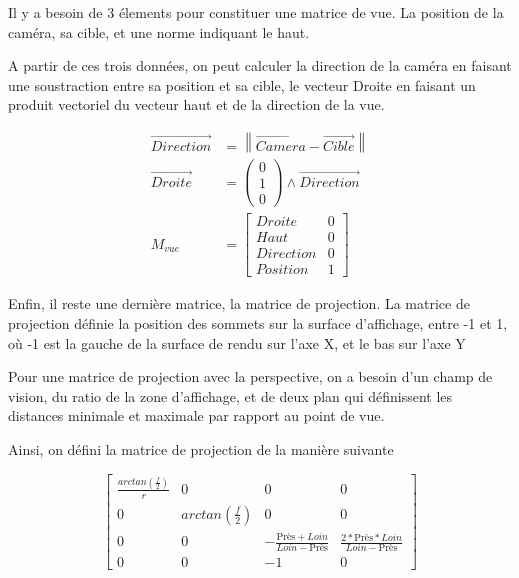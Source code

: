 \documentclass[pdftex, 11pt, a4paper, titlepage]{article}
\newcommand{\vect}[1]{\overrightarrow{#1}}
\begin{document}
Il y a besoin de 3 élements pour constituer une matrice de vue.  La
position de la caméra, sa cible, et une norme indiquant le haut.

A partir de ces trois données, on peut calculer la direction de la
caméra en faisant une soustraction entre sa position et sa cible, le
vecteur Droite en faisant un produit vectoriel du vecteur haut et de
la direction de la vue.

\begin{align*}
  \vect{Direction} &= \left\| \vect{Camera} - \vect{Cible} \right\|\\
  \vect{Droite} &=
  \begin{pmatrix}
    0 \\
    1 \\
    0
  \end{pmatrix}
  \wedge %
  \vect{Direction}\\
  M_{vue} &= 
  \begin{bmatrix}
    Droite    & 0 \\
    Haut      & 0 \\
    Direction & 0 \\
    Position  & 1
  \end{bmatrix}
\end{align*}

Enfin, il reste une dernière matrice, la matrice de projection.  La
matrice de projection définie la position des sommets sur la surface
d'affichage, entre -1 et 1, où -1 est la gauche de la surface de rendu
sur l'axe X, et le bas sur l'axe Y

Pour une matrice de projection avec la perspective, on a besoin d'un
champ de vision, du ratio de la zone d'affichage, et de deux plan qui
définissent les distances minimale et maximale par rapport au point de
vue.

Ainsi, on défini la matrice de projection de la manière suivante

\begin{equation*}
  \begin{bmatrix}
    \frac{arctan(\frac{f}{2})}{r} & 0                  & 0                                 & 0                                   \\
    0                             &arctan(\frac{f}{2}) & 0                                 & 0                                   \\
    0                             & 0                  & - \frac{\text{Près} + Loin}{Loin - \text{Près}} & \frac{2 * \text{Près} * Loin}{Loin - \text{Près}} \\
    0                             & 0                  & - 1                               & 0
  \end{bmatrix}
\end{equation*}
\end{document}
